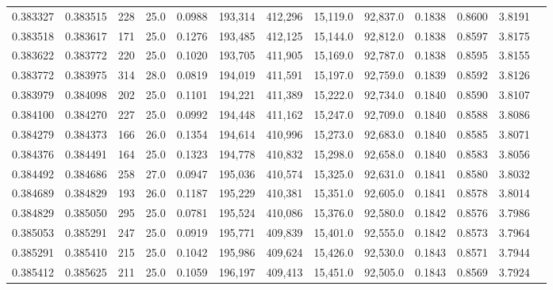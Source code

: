 \begin{tabular}{rrrrrrrrrrrrr}
0.383327 & 0.383515 &   228 & 25.0 &                                     0.0988 & 193,314 & 412,296 &  15,119.0 &  92,837.0 & 0.1838 & 0.8600 & 3.8191 \\
0.383518 & 0.383617 &   171 & 25.0 &                                     0.1276 & 193,485 & 412,125 &  15,144.0 &  92,812.0 & 0.1838 & 0.8597 & 3.8175 \\
0.383622 & 0.383772 &   220 & 25.0 &                                     0.1020 & 193,705 & 411,905 &  15,169.0 &  92,787.0 & 0.1838 & 0.8595 & 3.8155 \\
0.383772 & 0.383975 &   314 & 28.0 &                                     0.0819 & 194,019 & 411,591 &  15,197.0 &  92,759.0 & 0.1839 & 0.8592 & 3.8126 \\
0.383979 & 0.384098 &   202 & 25.0 &                                     0.1101 & 194,221 & 411,389 &  15,222.0 &  92,734.0 & 0.1840 & 0.8590 & 3.8107 \\
0.384100 & 0.384270 &   227 & 25.0 &                                     0.0992 & 194,448 & 411,162 &  15,247.0 &  92,709.0 & 0.1840 & 0.8588 & 3.8086 \\
0.384279 & 0.384373 &   166 & 26.0 &                                     0.1354 & 194,614 & 410,996 &  15,273.0 &  92,683.0 & 0.1840 & 0.8585 & 3.8071 \\
0.384376 & 0.384491 &   164 & 25.0 &                                     0.1323 & 194,778 & 410,832 &  15,298.0 &  92,658.0 & 0.1840 & 0.8583 & 3.8056 \\
0.384492 & 0.384686 &   258 & 27.0 &                                     0.0947 & 195,036 & 410,574 &  15,325.0 &  92,631.0 & 0.1841 & 0.8580 & 3.8032 \\
0.384689 & 0.384829 &   193 & 26.0 &                                     0.1187 & 195,229 & 410,381 &  15,351.0 &  92,605.0 & 0.1841 & 0.8578 & 3.8014 \\
0.384829 & 0.385050 &   295 & 25.0 &                                     0.0781 & 195,524 & 410,086 &  15,376.0 &  92,580.0 & 0.1842 & 0.8576 & 3.7986 \\
0.385053 & 0.385291 &   247 & 25.0 &                                     0.0919 & 195,771 & 409,839 &  15,401.0 &  92,555.0 & 0.1842 & 0.8573 & 3.7964 \\
0.385291 & 0.385410 &   215 & 25.0 &                                     0.1042 & 195,986 & 409,624 &  15,426.0 &  92,530.0 & 0.1843 & 0.8571 & 3.7944 \\
0.385412 & 0.385625 &   211 & 25.0 &                                     0.1059 & 196,197 & 409,413 &  15,451.0 &  92,505.0 & 0.1843 & 0.8569 & 3.7924 \\

\end{tabular}
